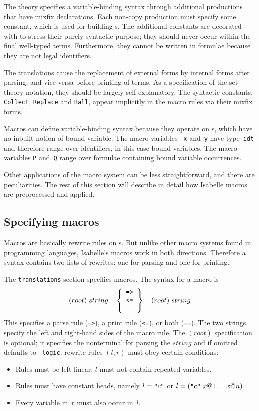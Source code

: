 The theory specifies a variable-binding syntax through additional
productions that have mixfix declarations.  Each non-copy production must
specify some constant, which is used for building \AST{}s.  The additional
constants are decorated with {\tt\at} to stress their purely syntactic
purpose; they should never occur within the final well-typed terms.
Furthermore, they cannot be written in formulae because they are not legal
identifiers.

The translations cause the replacement of external forms by internal forms
after parsing, and vice versa before printing of terms.  As a specification
of the set theory notation, they should be largely self-explanatory.  The
syntactic constants, {\tt\at Collect}, {\tt\at Replace} and {\tt\at Ball},
appear implicitly in the macro rules via their mixfix forms.

Macros can define variable-binding syntax because they operate on \AST{}s,
which have no inbuilt notion of bound variable.  The macro variables {\tt
  x} and~{\tt y} have type~{\tt idt} and therefore range over identifiers,
in this case bound variables.  The macro variables {\tt P} and~{\tt Q}
range over formulae containing bound variable occurrences.

Other applications of the macro system can be less straightforward, and
there are peculiarities.  The rest of this section will describe in detail
how Isabelle macros are preprocessed and applied.


\subsection{Specifying macros}
Macros are basically rewrite rules on \AST{}s.  But unlike other macro
systems found in programming languages, Isabelle's macros work in both
directions.  Therefore a syntax contains two lists of rewrites: one for
parsing and one for printing.

The {\tt translations} section specifies macros.  The syntax for a macro is
\[ (root)\; string \quad
   \left\{\begin{array}[c]{c} \mbox{\tt =>} \\ \mbox{\tt <=} \\ \mbox{\tt ==} \end{array}
   \right\} \quad
   (root)\; string 
\]
%
This specifies a parse rule ({\tt =>}), a print rule ({\tt <=}), or both
({\tt ==}).  The two strings specify the left and right-hand sides of the
macro rule.  The $(root)$ specification is optional; it specifies the
nonterminal for parsing the $string$ and if omitted defaults to {\tt
  logic}.  \AST{} rewrite rules $(l, r)$ must obey certain conditions:
\begin{itemize}
\item Rules must be left linear: $l$ must not contain repeated variables.

\item Rules must have constant heads, namely $l = \mbox{\tt "}c\mbox{\tt "}$ or $l =
  (\mbox{\tt "}c\mbox{\tt "} ~ x@1 \ldots x@n)$.

\item Every variable in~$r$ must also occur in~$l$.
\end{itemize}


